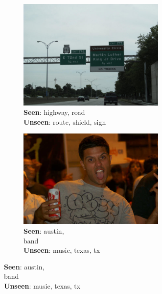 \begin{figure}
        \centering
	\captionsetup{justification=raggedright,
	singlelinecheck=false
	}
        \begin{subfigure}[b]{0.16\textwidth}
                \includegraphics[width=0.8\textwidth]{TagTree/Flickrimg/777b9480-f735-3d7a-aa91-dba84cea8bf2.jpeg} 
                \caption{\textbf{Seen}: highway, road \\ \textbf{Unseen}: route, shield, sign }
                \label{fig:posex1}
        \end{subfigure}%
	\; \vline
        \; %
        \begin{subfigure}[b]{0.17\textwidth}
                \includegraphics[width=0.8\textwidth]{TagTree/Flickrimg/e3bb5574-1a09-32cf-9f22-1a9eb81af7c2.jpeg}
                \caption{\textbf{Seen}: austin, \\ band \\ \textbf{Unseen}: music, texas, tx }
                \label{fig:posex2}
        \end{subfigure}%

\end{figure}
